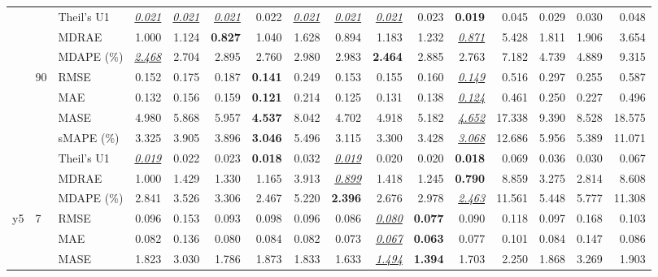 \begin{table}[!htbp]
{\begin{tabular}{lllrrrrrrrrrrrrr}
 &  & Theil's U1 & \underline{\textit{0.021}} & \underline{\textit{0.021}} & \underline{\textit{0.021}} & 0.022 & \underline{\textit{0.021}} & \underline{\textit{0.021}} & \underline{\textit{0.021}} & 0.023 & \textbf{0.019} & 0.045 & 0.029 & 0.030 & 0.048 \\
 &  & MDRAE & 1.000 & 1.124 & \textbf{0.827} & 1.040 & 1.628 & 0.894 & 1.183 & 1.232 & \underline{\textit{0.871}} & 5.428 & 1.811 & 1.906 & 3.654 \\
 &  & MDAPE (\%) & \underline{\textit{2.468}} & 2.704 & 2.895 & 2.760 & 2.980 & 2.983 & \textbf{2.464} & 2.885 & 2.763 & 7.182 & 4.739 & 4.889 & 9.315 \\
\cmidrule(lr){2-16}
 & 90 & RMSE & 0.152 & 0.175 & 0.187 & \textbf{0.141} & 0.249 & 0.153 & 0.155 & 0.160 & \underline{\textit{0.149}} & 0.516 & 0.297 & 0.255 & 0.587 \\
 &  & MAE & 0.132 & 0.156 & 0.159 & \textbf{0.121} & 0.214 & 0.125 & 0.131 & 0.138 & \underline{\textit{0.124}} & 0.461 & 0.250 & 0.227 & 0.496 \\
 &  & MASE & 4.980 & 5.868 & 5.957 & \textbf{4.537} & 8.042 & 4.702 & 4.918 & 5.182 & \underline{\textit{4.652}} & 17.338 & 9.390 & 8.528 & 18.575 \\
 &  & sMAPE (\%) & 3.325 & 3.905 & 3.896 & \textbf{3.046} & 5.496 & 3.115 & 3.300 & 3.428 & \underline{\textit{3.068}} & 12.686 & 5.956 & 5.389 & 11.071 \\
 &  & Theil's U1 & \underline{\textit{0.019}} & 0.022 & 0.023 & \textbf{0.018} & 0.032 & \underline{\textit{0.019}} & 0.020 & 0.020 & \textbf{0.018} & 0.069 & 0.036 & 0.030 & 0.067 \\
 &  & MDRAE & 1.000 & 1.429 & 1.330 & 1.165 & 3.913 & \underline{\textit{0.899}} & 1.418 & 1.245 & \textbf{0.790} & 8.859 & 3.275 & 2.814 & 8.608 \\
 &  & MDAPE (\%) & 2.841 & 3.526 & 3.306 & 2.467 & 5.220 & \textbf{2.396} & 2.676 & 2.978 & \underline{\textit{2.463}} & 11.561 & 5.448 & 5.777 & 11.308 \\
\midrule
y5 & 7 & RMSE & 0.096 & 0.153 & 0.093 & 0.098 & 0.096 & 0.086 & \underline{\textit{0.080}} & \textbf{0.077} & 0.090 & 0.118 & 0.097 & 0.168 & 0.103 \\
 &  & MAE & 0.082 & 0.136 & 0.080 & 0.084 & 0.082 & 0.073 & \underline{\textit{0.067}} & \textbf{0.063} & 0.077 & 0.101 & 0.084 & 0.147 & 0.086 \\
 &  & MASE & 1.823 & 3.030 & 1.786 & 1.873 & 1.833 & 1.633 & \underline{\textit{1.494}} & \textbf{1.394} & 1.703 & 2.250 & 1.868 & 3.269 & 1.903 \\

\end{tabular}}
\end{table}
